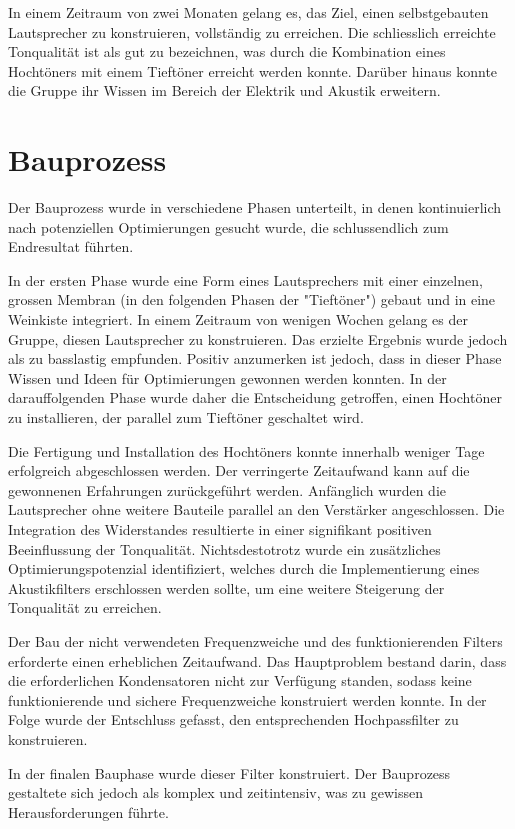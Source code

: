\documentclass[a4paper,11pt]{report}
\begin{document}
In einem Zeitraum von zwei Monaten gelang es, das Ziel, einen selbstgebauten Lautsprecher zu konstruieren, vollständig zu erreichen. Die schliesslich erreichte Tonqualität ist als gut zu bezeichnen, was durch die Kombination eines Hochtöners mit einem Tieftöner erreicht werden konnte. Darüber hinaus konnte die Gruppe ihr Wissen im Bereich der Elektrik und Akustik erweitern. 

\section{Bauprozess}
Der Bauprozess wurde in verschiedene Phasen unterteilt, in denen kontinuierlich nach potenziellen Optimierungen gesucht wurde, die schlussendlich zum Endresultat führten.

In der ersten Phase wurde eine Form eines Lautsprechers mit einer einzelnen, grossen Membran (in den folgenden Phasen der "Tieftöner") gebaut und in eine Weinkiste integriert. In einem Zeitraum von wenigen Wochen gelang es der Gruppe, diesen Lautsprecher zu konstruieren. Das erzielte Ergebnis wurde jedoch als zu basslastig empfunden. Positiv anzumerken ist jedoch, dass in dieser Phase Wissen und Ideen für Optimierungen gewonnen werden konnten. In der darauffolgenden Phase wurde daher die Entscheidung getroffen, einen Hochtöner zu installieren, der parallel zum Tieftöner geschaltet wird. 

Die Fertigung und Installation des Hochtöners konnte innerhalb weniger Tage erfolgreich abgeschlossen werden. Der verringerte Zeitaufwand kann auf die gewonnenen Erfahrungen zurückgeführt werden. Anfänglich wurden die Lautsprecher ohne weitere Bauteile parallel an den Verstärker angeschlossen. Die Integration des Widerstandes resultierte in einer signifikant positiven Beeinflussung der Tonqualität. Nichtsdestotrotz wurde ein zusätzliches Optimierungspotenzial identifiziert, welches durch die Implementierung eines Akustikfilters erschlossen werden sollte, um eine weitere Steigerung der Tonqualität zu erreichen.

Der Bau der nicht verwendeten Frequenzweiche und des funktionierenden Filters erforderte einen erheblichen Zeitaufwand. Das Hauptproblem bestand darin, dass die erforderlichen Kondensatoren nicht zur Verfügung standen, sodass keine funktionierende und sichere Frequenzweiche konstruiert werden konnte. In der Folge wurde der Entschluss gefasst, den entsprechenden Hochpassfilter zu konstruieren.

In der finalen Bauphase wurde dieser Filter konstruiert. Der Bauprozess gestaltete sich jedoch als komplex und zeitintensiv, was zu gewissen Herausforderungen führte.        
\end{document}
